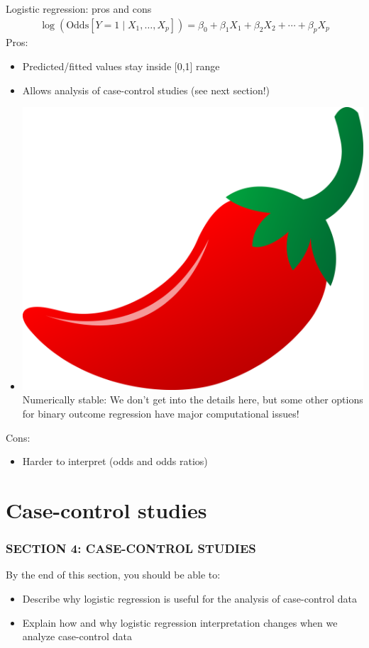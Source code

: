 \documentclass[10pt,t]{beamer}
\begin{document}
\begin{frame}{Logistic regression: pros and cons}
	\begin{align*}
		\log(\text{Odds}[Y = 1 \mid X_1,\dots, X_p]) = \beta_0 + \beta_1X_1 + \beta_2X_2 + \cdots + \beta_pX_p
	\end{align*}
	Pros:
	\begin{itemize}
		\item Predicted/fitted values stay inside [0,1] range
		\item Allows analysis of case-control studies (see next section!)
		\item \includegraphics[scale=0.01]{./figs/chilipepper} Numerically stable: We don't get into the details here, but some other options for binary outcome regression have major computational issues!
	\end{itemize}
	Cons:
	\begin{itemize}
		\item Harder to interpret (odds and odds ratios)
	\end{itemize}
\end{frame}

\section{Case-control studies}
\begin{frame}
	\frametitle{SECTION 4: CASE-CONTROL STUDIES}
	By the end of this section, you should be able to:
	\begin{itemize}
		\item Describe why logistic regression is useful for the analysis of case-control data
		\item Explain how and why logistic regression interpretation changes when we analyze case-control data
	\end{itemize}
\end{frame}
\end{document}
